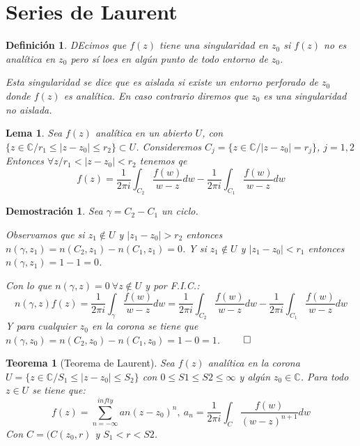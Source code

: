 \documentclass[10pt]{book}
\newtheorem{defi}{Definición}[chapter]
\newtheorem{theorem}{Teorema}[chapter]
\newtheorem*{dem}{Demostración}
\newtheorem{lema}{Lema}[chapter]
\newcommand{\C}{\mathbb{C}}
\begin{document}
\section{Series de Laurent}
\begin{defi}
DEcimos que $f(z)$ tiene una singularidad en $z_0$ si $f(z)$ no es analítica en $z_0$ pero sí loes en algún punto de todo entorno de $z_0$.

Esta singularidad se dice que es aislada si existe un entorno perforado de $z_0$ donde $f(z)$ es analítica. En caso contrario diremos que $z_0$ es una singularidad no aislada.
\end{defi}

\begin{lema}
Sea $f(z)$ analítica en un abierto $U$, con $\{z\in\C / r_1 \leq |z-z_0|\leq r_2\} \subset U$. Consideremos $C_j = \{z\in\C / |z-z_0| = r_j\}$, $j= 1,2$
Entonces $\forall z/ r_1 < |z-z_0| < r_2$ tenemos qe 
$$f(z) = \frac{1}{2\pi i} \int_{C_2} \frac{f(w)}{w-z}dw - \frac{1}{2\pi i} \int_{C_1} \frac{f(w)}{w-z}dw$$
\end{lema}

\begin{dem}
Sea $\gamma = C_2 -C_1$ un ciclo.

Observamos que si $z_1 \notin U$ y $|z_1-z_0|> r_2$ entonces $n(\gamma,z_1) = n(C_2,z_1) - n(C_1,z_1) = 0$. Y si $z_1 \notin U$ y $|z_1-z_0| <r_1$ entonces $n(\gamma,z_1) = 1-1 = 0$.

Con lo que $n(\gamma,z) = 0 \ \forall z\notin U$ y por F.I.C.:
$$n(\gamma,z)f(z) = \frac{1}{2\pi i} \int_{\gamma} \frac{f(w)}{w-z}dw = \frac{1}{2\pi i} \int_{C_2} \frac{f(w)}{w-z}dw - \frac{1}{2\pi i} \int_{C_1} \frac{f(w)}{w-z}dw$$
Y para cualquier $z_0$ en la corona se tiene que $n(\gamma,z_0) = n(C_2,z_0) - n(C_1,z_0)=1-0 = 1$. $\qed$
\end{dem}


\begin{theorem}[Teorema de Laurent]
Sea $f(z)$ analítica en la corona $U = \{z\in\C / S_1 \leq |z-z_0|\leq S_2\}$ con $0\leq S1\leq S2\leq \infty$ y algún $z_0 \in \C$. Para todo $z\in U$ se tiene que:
$$f(z) = \sum_{n=-\infty}^{infty} an(z-z_0)^n,\ a_n = \frac{1}{2\pi i}\int_C \frac{f(w)}{(w-z)^{n+1}}dw$$
Con $C = (C(z_0,r)$ y $S_1 < r< S2$.
\end{theorem}
\end{document}
